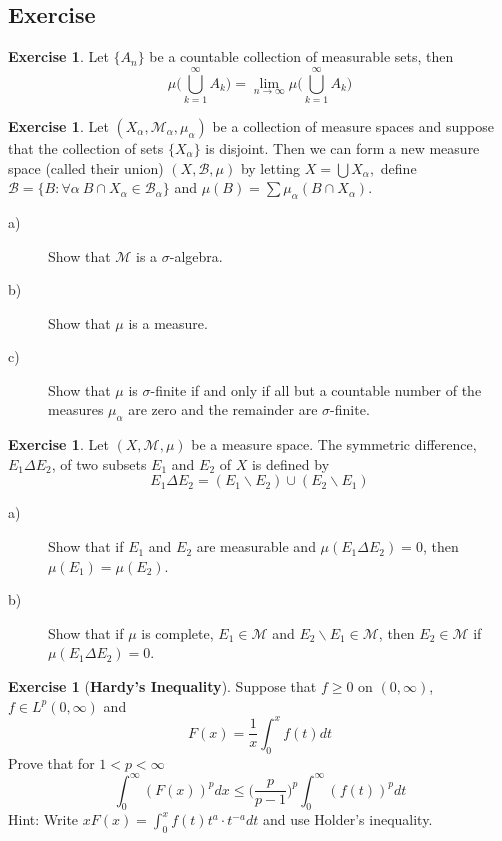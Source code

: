 \documentclass[	DIV=calc,paper=a4,fontsize=11pt]{scrartcl}	 	%
\theoremstyle{definition}
\newtheorem{exer}[thm]{Exercise}
\theoremstyle{plain}
\theoremstyle{remark}
\begin{document}
\newpage
\subsection{Exercise}
\begin{exer}\label{100}
Let $\{A_n\}$ be a countable collection of measurable sets, then
\[\mu\biggl(\bigcup_{k=1}^{\infty}A_k\biggl)=\lim_{n\to\infty} \mu\biggl(\bigcup_{k=1}^{\infty}A_k\biggl)\]
\end{exer}
\begin{exer}\label{100a}
Let $(X_{\alpha}, \mathcal{M}_{\alpha}, \mu_{\alpha})$ be a collection of measure spaces and suppose that the collection of sets $\{X_{\alpha}\}$ is disjoint. Then we can form a new measure space (called their union) $(X, \mathcal{B}, \mu)$ by letting $X =\bigcup X_{\alpha},$  define $ \mathcal{B}=\{B : \forall\alpha\ B\cap X_{\alpha}\in \mathcal{B}_{\alpha}\}$ and $\mu(B) =\sum \mu_{\alpha}(B\cap X_{\alpha}).$
\begin{description}
  \item[a)] Show that $\mathcal{M}$ is a $\sigma$-algebra.
  \item[b)] Show that $\mu$ is a measure.
  \item[c)] Show that $\mu$ is $\sigma$-finite if and only if all but a countable number of the measures $\mu_{\alpha}$ are zero and the remainder are $\sigma$-finite.
\end{description}
\end{exer}

\begin{exer}\label{100b}
Let $(X, \mathcal{M}, \mu)$ be a measure space. The symmetric difference, $E_1\Delta E_2$, of two subsets $E_1$ and $E_2$ of $X$ is defined by
\[ E_1\Delta E_2 = (E_1\backslash E_2)\cup (E_2\backslash E_1)\]
\begin{description}
  \item[a)] Show that if $E_1$ and $E_2$ are measurable and $\mu(E_1\Delta E_2) = 0$, then $\mu(E_1)=\mu(E_2)$.
  \item[b)] Show that if $\mu$ is complete, $E_1\in \mathcal{M}$ and $E_2\backslash E_1\in \mathcal{M}$, then $E_2\in \mathcal{M}$ if $\mu(E_1\Delta E_2)=0$.
\end{description}
\end{exer}

\begin{exer}[\textbf{Hardy's Inequality}]\label{101}
Suppose that $f\geq 0$ on $(0,\infty)$, $f\in L^{p}(0,\infty)$ and
  \[F(x)=\frac{1}{x}\int_0^x f(t)dt\]
  Prove that for $1<p<\infty$
  \[\int_{0}^{\infty}(F(x))^p dx\leq \biggl(\frac{p}{p-1}\biggl)^p\int_0^{\infty}(f(t))^pdt\]
  Hint: Write $xF(x)=\int_{0}^{x}f(t)t^{a}\cdot t^{-a}dt$ and use Holder's inequality.
\end{exer}
\end{document}
